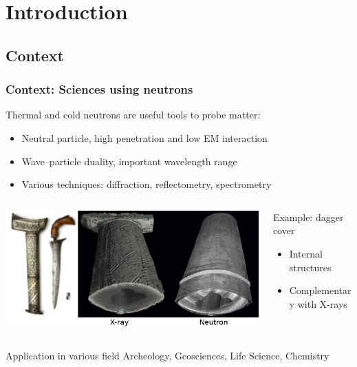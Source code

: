 
\section{Introduction}
\subsection{Context}
\begin{frame}[t]
  \frametitle{Context: Sciences using neutrons}
  Thermal and cold neutrons are useful tools to probe matter:
  \begin{itemize}
    \item Neutral particle, high penetration and low EM interaction
    \item Wave–particle duality, important wavelength range
    \item Various techniques: diffraction, reflectometry, spectrometry
  \end{itemize}
  \begin{columns}[T]
    \begin{column}{0.65\textwidth}
      \includegraphics[width=\textwidth]{01_Neutron/fig/fig000_Dague2.png}
    \end{column}
    \begin{column}{0.3\textwidth}
      \begin{block}{Example: dagger cover}
        \begin{itemize}
          \item Internal structures
          \item Complementary with X-rays
        \end{itemize}

      \end{block}
    \end{column}
  \end{columns}
  \begin{block}{Application in various field}
    Archeology, Geosciences, Life Science, Chemistry
  \end{block}
\end{frame}

